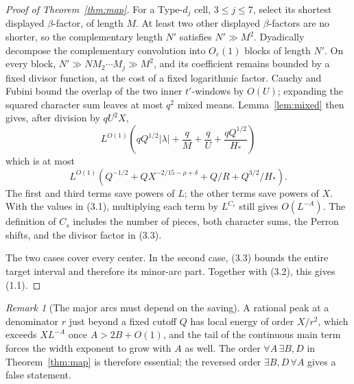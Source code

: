 \documentclass[11pt]{article}
\theoremstyle{remark}
\newtheorem{remark}[theorem]{Remark}
\newcommand{\eps}{\varepsilon}
\newcommand{\1}{\mathbf 1}
\begin{document}
\begin{proof}[Proof of Theorem~\ref{thm:map}]
For a Type-$d_j$ cell, $3\le j\le7$, select its shortest displayed
$\beta$-factor, of length $M$.  At least two other displayed $\beta$-factors
are no shorter, so the
complementary length $N'$ satisfies $N'\gg M^2$.  Dyadically decompose the
complementary convolution into $O_\eps(1)$ blocks of length $N'$.  On every
block, $N'\gg NM_2\cdots M_j\gg M^2$, and its coefficient remains bounded by
a fixed divisor function, at the cost of a fixed logarithmic factor.  Cauchy
and Fubini bound the overlap of the two inner $t'$-windows by $O(U)$;
expanding the squared character sum leaves at most $q^2$ mixed means.
Lemma~\ref{lem:mixed}
then gives, after division by $qU^2X$,
\[
 L^{O(1)}\left(qQ^{1/2}|\lambda|+\frac qM+\frac qU
 +\frac{qQ^{1/2}}{H_*}\right)                           \tag{3.6}
\]
which is at most
\[
 L^{O(1)}\left(Q^{-1/2}+QX^{-2/15-\rho+\delta}
 +Q/R+Q^{3/2}/H_*\right).                               \tag{3.7}
\]
The first and third terms save powers of \(L\); the other terms save powers of
\(X\).  With the values in (3.1), multiplying each term by \(L^{C_s}\)
still gives \(O(L^{-A})\).  The definition of \(C_s\) includes the number of
pieces, both character sums, the Perron shifts, and the divisor factor in
(3.3).

The two cases cover every center.  In the second case, (3.3) bounds the entire
target interval and therefore its minor-arc part.  Together with (3.2), this
gives (1.1).
\end{proof}

\begin{remark}[The major arcs must depend on the saving]
A rational peak at a denominator $r$ just beyond a fixed cutoff $Q$ has local
energy of order $X/r^2$, which exceeds $XL^{-A}$ once $A>2B+O(1)$, and the
tail of the continuous main term forces the width exponent to grow with $A$
as well.  The order $\forall A\,\exists B,D$ in Theorem~\ref{thm:map} is
therefore essential; the reversed order $\exists B,D\,\forall A$ gives a
false statement.
\end{remark}
\end{document}
